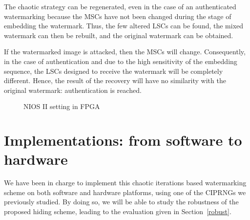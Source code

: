 The chaotic strategy can be regenerated, 
even in the case of an authenticated watermarking because 
the MSCs have not been changed during the stage of embedding the watermark. Thus, 
the few altered LSCs can be found, the mixed watermark can then be rebuilt, 
and the original watermark can be obtained.

If the watermarked image is attacked, then the MSCs will change. Consequently, 
in the case of authentication and due to the high sensitivity of the embedding sequence, 
the LSCs designed to receive the watermark will be completely different. Hence, the result 
of the recovery will have no similarity with the original watermark: authentication is reached.


\begin{figure}[h!]
\centering
{} \hspace{0.5cm}
 \hspace{0.5cm}
\caption{NIOS II setting in FPGA}
\label{Spatial MSCs and LSCs of Lena}
\end{figure}

\section{Implementations: from software to hardware}

We have been in charge to implement this chaotic iterations based watermarking
scheme on both software and hardware platforms, using one of the CIPRNGs we
previously studied. By doing so, we will be able to study the robustness
of the proposed hiding scheme, leading to the evaluation given in Section~\ref{robust}.

